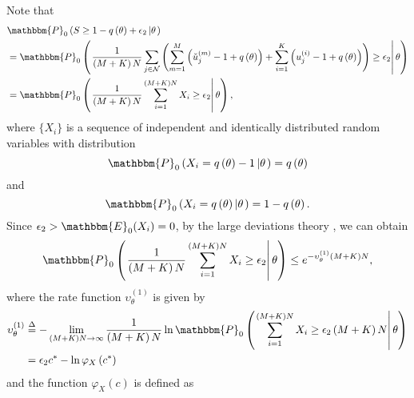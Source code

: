 \documentclass[11pt, draftclsnofoot, onecolumn]{IEEEtran}
\newcommand{\bbE}{\mathbbm{E}}
\newcommand{\bbP}{\mathbbm{P}}
\begin{document}
\begin{IEEEproof}
Note that
\begin{align} \notag
& {\bbP_0}\left( {S \ge 1 - q\left( \theta  \right) + {\epsilon _2}\left| \theta  \right.} \right) \\ \notag
& = {\bbP_0}\left(  { \left. \frac{1}{{\left( {M + K} \right)N}}\sum\limits_{j \in {\cal N}} {\left( {\sum\limits_{m = 1}^M {\left( {{\check{u}}_j^{(m)} - 1 + q\left( \theta  \right)  } \right)}  + \sum\limits_{i = 1}^K {\left( {u_j^{(i)} - 1 + q\left( \theta  \right) } \right)} } \right)}  \ge {\epsilon _2} \right| \theta  } \right)\\ \label{prob_bound_1_1}
& = {\bbP_0}\left(  { \left. \frac{1}{{\left( {M + K} \right)N}}\sum\limits_{i = 1}^{\left( {M + K} \right)N} {{X_i}}  \ge {\epsilon _2} \right| \theta  } \right),
\end{align}
where $\{X_i\}$ is a sequence of independent and identically distributed random variables with distribution
\begin{equation} \label{pmf_X_1}
{\bbP_0}\left( {{X_i} = q\left( \theta  \right) - 1\left| \theta  \right.} \right) = q\left( \theta  \right)
\end{equation}
and
\begin{equation}  \label{pmf_X_2}
{\bbP_0}\left( {{X_i} = q\left( \theta  \right) \left| \theta  \right.} \right) = 1- q\left( \theta  \right).
\end{equation}
Since ${\epsilon _2} > \bbE_0(X_i) = 0$, by the large deviations theory \cite{dembo2010large}, we can obtain
\begin{equation} \label{prob_bound_1_2}
{\bbP_0}\left( { \left. \frac{1}{{\left( {M + K} \right)N}}\sum\limits_{i = 1}^{\left( {M + K} \right)N} {{X_i}}  \ge {\epsilon _2} \right| \theta  } \right) \le {e^{ - \upsilon _\theta ^{\left( 1 \right)}\left( {M + K} \right)N}},
\end{equation}
where the rate function $\upsilon_\theta ^{\left( 1 \right)}$ is given by
\begin{align} \notag
\upsilon _\theta ^{\left( 1 \right)} & \buildrel \Delta \over = -\mathop {\lim }\limits_{\left( {M + K} \right)N \to \infty } \frac{1}{{\left( {M + K} \right)N}}\ln {\bbP_0}\left( { \left. \sum\limits_{i = 1}^{\left( {M + K} \right)N} {{X_i}}  \ge {\epsilon _2}\left( {M + K} \right)N\right| \theta  } \right) \\ \label{rate_function_define}
& =   {\epsilon _2}{c^*} - \ln \varphi_X \left( {{c^*}} \right)
\end{align}
and the function $ \varphi_X \left( {{c}} \right)$ is defined as
\begin{equation} \label{phi_define}

\end{equation}
\end{IEEEproof}
\end{document}
